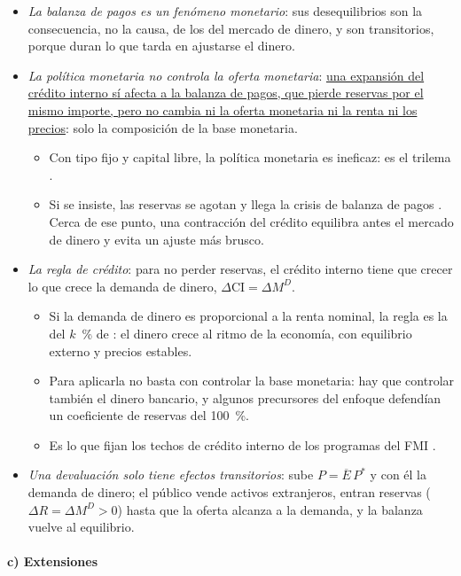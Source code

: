\documentclass[11pt]{article}
\begin{document}
\begin{itemize}
\item \emph{La balanza de pagos es un fenómeno monetario}: sus desequilibrios son la consecuencia, no la causa, de los del mercado de dinero, y son transitorios, porque duran lo que tarda en ajustarse el dinero.
\item \emph{La política monetaria no controla la oferta monetaria}: \uline{una expansión del crédito interno sí afecta a la balanza de pagos, que pierde reservas por el mismo importe, pero no cambia ni la oferta monetaria ni la renta ni los precios}: solo la composición de la base monetaria.
  \begin{itemize}
  \item Con tipo fijo y capital libre, la política monetaria es ineficaz: es el trilema .
  \item Si se insiste, las reservas se agotan y llega la crisis de balanza de pagos\nocite{Krugman1979Model} . Cerca de ese punto, una contracción del crédito equilibra antes el mercado de dinero y evita un ajuste más brusco.
  \end{itemize}
\item \emph{La regla de crédito}: para no perder reservas, el crédito interno tiene que crecer lo que crece la demanda de dinero, $\Delta\mathrm{CI}=\Delta M^D$.
  \begin{itemize}
  \item Si la demanda de dinero es proporcional a la renta nominal, la regla es la del $k$~\% de \textcite{Friedman1960Program}: el dinero crece al ritmo de la economía, con equilibrio externo y precios estables.
  \item Para aplicarla no basta con controlar la base monetaria: hay que controlar también el dinero bancario, y algunos precursores del enfoque defendían un coeficiente de reservas del 100~\%.
  \item Es lo que fijan los techos de crédito interno de los programas del FMI .
  \end{itemize}
\item \emph{Una devaluación solo tiene efectos transitorios}: sube $P=\overline E\,P^*$ y con él la demanda de dinero; el público vende activos extranjeros, entran reservas ($\Delta R=\Delta M^D>0$) hasta que la oferta alcanza a la demanda, y la balanza vuelve al equilibrio.
\end{itemize}

\paragraph{c) Extensiones}
\end{document}
